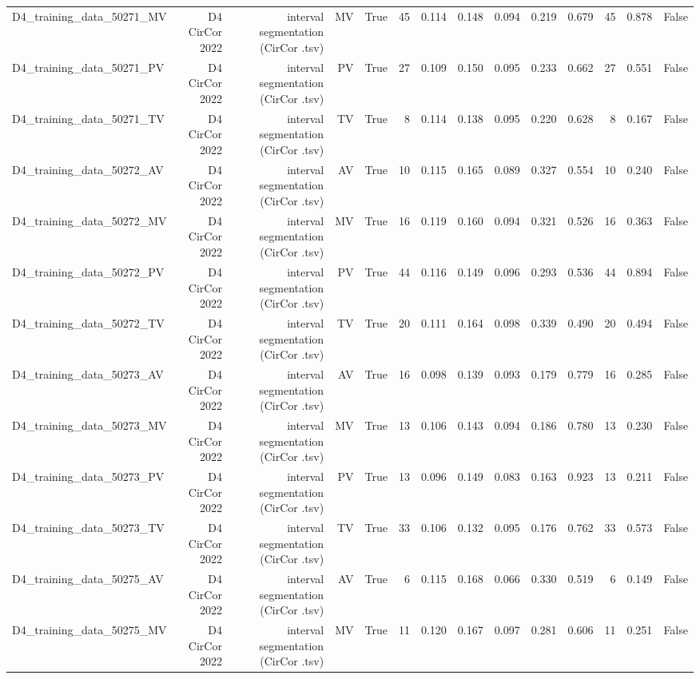 \begin{table}[htbp]
\begin{tabular}{lrrrrrrrrrrrrr}
    D4\_training\_data\_50271\_MV & D4 CirCor 2022 & interval segmentation (CirCor .tsv) & MV & True & 45 & 0.114 & 0.148 & 0.094 & 0.219 & 0.679 & 45 & 0.878 & False \\
    D4\_training\_data\_50271\_PV & D4 CirCor 2022 & interval segmentation (CirCor .tsv) & PV & True & 27 & 0.109 & 0.150 & 0.095 & 0.233 & 0.662 & 27 & 0.551 & False \\
    D4\_training\_data\_50271\_TV & D4 CirCor 2022 & interval segmentation (CirCor .tsv) & TV & True & 8 & 0.114 & 0.138 & 0.095 & 0.220 & 0.628 & 8 & 0.167 & False \\
    D4\_training\_data\_50272\_AV & D4 CirCor 2022 & interval segmentation (CirCor .tsv) & AV & True & 10 & 0.115 & 0.165 & 0.089 & 0.327 & 0.554 & 10 & 0.240 & False \\
    D4\_training\_data\_50272\_MV & D4 CirCor 2022 & interval segmentation (CirCor .tsv) & MV & True & 16 & 0.119 & 0.160 & 0.094 & 0.321 & 0.526 & 16 & 0.363 & False \\
    D4\_training\_data\_50272\_PV & D4 CirCor 2022 & interval segmentation (CirCor .tsv) & PV & True & 44 & 0.116 & 0.149 & 0.096 & 0.293 & 0.536 & 44 & 0.894 & False \\
    D4\_training\_data\_50272\_TV & D4 CirCor 2022 & interval segmentation (CirCor .tsv) & TV & True & 20 & 0.111 & 0.164 & 0.098 & 0.339 & 0.490 & 20 & 0.494 & False \\
    D4\_training\_data\_50273\_AV & D4 CirCor 2022 & interval segmentation (CirCor .tsv) & AV & True & 16 & 0.098 & 0.139 & 0.093 & 0.179 & 0.779 & 16 & 0.285 & False \\
    D4\_training\_data\_50273\_MV & D4 CirCor 2022 & interval segmentation (CirCor .tsv) & MV & True & 13 & 0.106 & 0.143 & 0.094 & 0.186 & 0.780 & 13 & 0.230 & False \\
    D4\_training\_data\_50273\_PV & D4 CirCor 2022 & interval segmentation (CirCor .tsv) & PV & True & 13 & 0.096 & 0.149 & 0.083 & 0.163 & 0.923 & 13 & 0.211 & False \\
    D4\_training\_data\_50273\_TV & D4 CirCor 2022 & interval segmentation (CirCor .tsv) & TV & True & 33 & 0.106 & 0.132 & 0.095 & 0.176 & 0.762 & 33 & 0.573 & False \\
    D4\_training\_data\_50275\_AV & D4 CirCor 2022 & interval segmentation (CirCor .tsv) & AV & True & 6 & 0.115 & 0.168 & 0.066 & 0.330 & 0.519 & 6 & 0.149 & False \\
    D4\_training\_data\_50275\_MV & D4 CirCor 2022 & interval segmentation (CirCor .tsv) & MV & True & 11 & 0.120 & 0.167 & 0.097 & 0.281 & 0.606 & 11 & 0.251 & False \\

\end{tabular}
\end{table}
